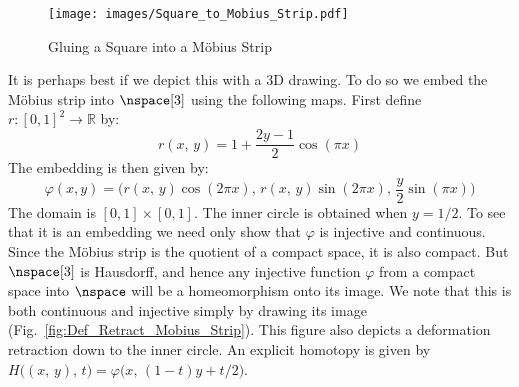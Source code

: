         \hfill
        \par\vspace{2.5ex}
        \begin{figure}
            \centering
            \captionsetup{type=figure}
            \texttt{[image: images/Square\_to\_Mobius\_Strip.pdf]}
            \caption{Gluing a Square into a M\"{o}bius Strip}
            \label{fig:Square_to_Mobius_Strip}
        \end{figure}
        It is perhaps best if we depict this with a 3D drawing. To do so
        we embed the M\"{o}bius strip into $\nspace[3]$ using the
        following maps. First define $r:[0,1]^{2}\rightarrow\mathbb{R}$
        by:
        \begin{equation}
            r(x,\,y)=1+\frac{2y-1}{2}\cos(\pi{x})
        \end{equation}
        The embedding is then given by:
        \begin{equation}
            \varphi(x,y)=
            \big(r(x,\,y)\cos(2\pi{x}),\,
                 r(x,\,y)\sin(2\pi{x}),\,
                 \frac{y}{2}\sin(\pi{x})\big)
        \end{equation}
        The domain is $[0,1]\times[0,1]$. The inner circle is
        obtained when $y=1/2$. To see that it is an embedding we need
        only show that $\varphi$ is injective and continuous. Since
        the M\"{o}bius strip is the quotient of a compact space, it is
        also compact. But $\nspace[3]$ is Hausdorff, and hence any
        injective function $\varphi$ from a compact space into $\nspace$
        will be a homeomorphism onto its image. We note that this is
        both continuous and injective simply by drawing its image
        (Fig.~\ref{fig:Def_Retract_Mobius_Strip}). This figure also
        depicts a deformation retraction down to the inner circle.
        An explicit homotopy is given by
        $H\big((x,\,y),\,t\big)=\varphi\big(x,\,(1-t)y+t/2\big)$.
